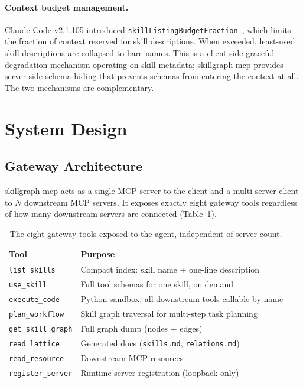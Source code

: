 \documentclass[11pt,a4paper]{article}
\begin{document}
\paragraph{Context budget management.}
Claude Code v2.1.105 introduced \texttt{skillListingBudgetFraction}~\cite{claudecode2026settings},
which limits the fraction of context reserved for skill descriptions. When exceeded,
least-used skill descriptions are collapsed to bare names. This is a client-side
graceful degradation mechanism operating on skill metadata; skillgraph-mcp provides
server-side schema hiding that prevents schemas from entering the context at all.
The two mechanisms are complementary.

\section{System Design}
\label{sec:design}

\subsection{Gateway Architecture}

skillgraph-mcp acts as a single MCP server to the client and a multi-server client
to $N$ downstream MCP servers. It exposes exactly eight gateway tools regardless of
how many downstream servers are connected (Table~\ref{tab:tools}).

\begin{table}[h]
\centering
\small
\begin{tabular}{ll}
\toprule
\textbf{Tool} & \textbf{Purpose} \\
\midrule
\texttt{list\_skills}    & Compact index: skill name + one-line description \\
\texttt{use\_skill}      & Full tool schemas for one skill, on demand \\
\texttt{execute\_code}   & Python sandbox; all downstream tools callable by name \\
\texttt{plan\_workflow}  & Skill graph traversal for multi-step task planning \\
\texttt{get\_skill\_graph} & Full graph dump (nodes + edges) \\
\texttt{read\_lattice}   & Generated docs (\texttt{skills.md}, \texttt{relations.md}) \\
\texttt{read\_resource}  & Downstream MCP resources \\
\texttt{register\_server} & Runtime server registration (loopback-only) \\
\bottomrule
\end{tabular}
\caption{The eight gateway tools exposed to the agent, independent of server count.}
\label{tab:tools}
\end{table}
\end{document}
